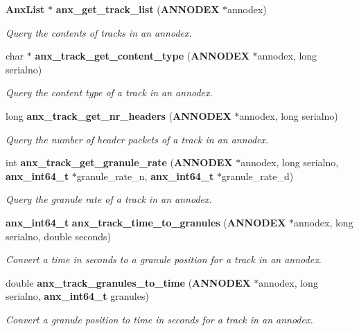 \begin{CompactItemize}
\item 
{\bf Anx\-List} $\ast$ {\bf anx\_\-get\_\-track\_\-list} ({\bf ANNODEX} $\ast$annodex)
\begin{CompactList}\small\item\em Query the contents of tracks in an annodex. \item\end{CompactList}\item 
char $\ast$ {\bf anx\_\-track\_\-get\_\-content\_\-type} ({\bf ANNODEX} $\ast$annodex, long serialno)
\begin{CompactList}\small\item\em Query the content type of a track in an annodex. \item\end{CompactList}\item 
long {\bf anx\_\-track\_\-get\_\-nr\_\-headers} ({\bf ANNODEX} $\ast$annodex, long serialno)
\begin{CompactList}\small\item\em Query the number of header packets of a track in an annodex. \item\end{CompactList}\item 
int {\bf anx\_\-track\_\-get\_\-granule\_\-rate} ({\bf ANNODEX} $\ast$annodex, long serialno, {\bf anx\_\-int64\_\-t} $\ast$granule\_\-rate\_\-n, {\bf anx\_\-int64\_\-t} $\ast$granule\_\-rate\_\-d)
\begin{CompactList}\small\item\em Query the granule rate of a track in an annodex. \item\end{CompactList}\item 
{\bf anx\_\-int64\_\-t} {\bf anx\_\-track\_\-time\_\-to\_\-granules} ({\bf ANNODEX} $\ast$annodex, long serialno, double seconds)
\begin{CompactList}\small\item\em Convert a time in seconds to a granule position for a track in an annodex. \item\end{CompactList}\item 
double {\bf anx\_\-track\_\-granules\_\-to\_\-time} ({\bf ANNODEX} $\ast$annodex, long serialno, {\bf anx\_\-int64\_\-t} granules)
\begin{CompactList}\small\item\em Convert a granule position to time in seconds for a track in an annodex. \item\end{CompactList}\end{CompactItemize}


